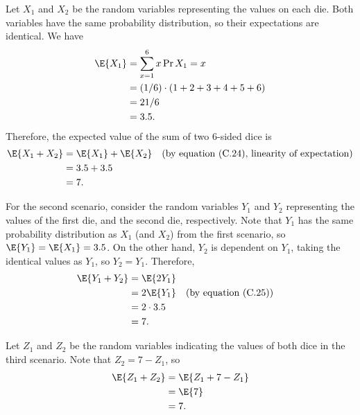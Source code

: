 Let $X_1$ and $X_2$ be the random variables representing the values on each die.
Both variables have the same probability distribution, so their expectations are identical.
We have
\begin{align*}
    \E{X_1} &= \sum_{x=1}^6x\Pr{X_1=x} \\
    &= (1/6)\cdot(1+2+3+4+5+6) \\
    &= 21/6 \\
    &= 3.5.
\end{align*}
Therefore, the expected value of the sum of two 6-sided dice is
\begin{align*}
    \E{X_1+X_2} &= \E{X_1}+\E{X_2} && \text{(by equation (C.24), linearity of expectation)} \\
    &= 3.5+3.5 \\
    &= 7.
\end{align*}

For the second scenario, consider the random variables $Y_1$ and $Y_2$ representing the values of the first die, and the second die, respectively.
Note that $Y_1$ has the same probability distribution as $X_1$ (and $X_2$) from the first scenario, so $\E{Y_1}=\E{X_1}=3.5$.
On the other hand, $Y_2$ is dependent on $Y_1$, taking the identical values as $Y_1$, so $Y_2=Y_1$.
Therefore,
\begin{align*}
    \E{Y_1+Y_2} &= \E{2Y_1} \\
    &= 2\E{Y_1} && \text{(by equation (C.25))} \\
    &= 2\cdot3.5 \\
    &= 7.
\end{align*}

Let $Z_1$ and $Z_2$ be the random variables indicating the values of both dice in the third scenario.
Note that $Z_2=7-Z_1$, so
\begin{align*}
    \E{Z_1+Z_2} &= \E{Z_1+7-Z_1} \\
    &= \E{7} \\
    &= 7.
\end{align*}
